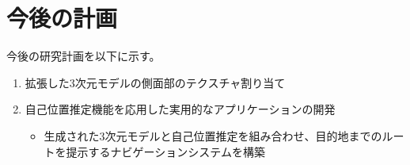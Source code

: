 \documentclass[]{jarticle}          %
\begin{document}
\section{今後の計画}
今後の研究計画を以下に示す。
\begin{enumerate}
  \item 拡張した3次元モデルの側面部のテクスチャ割り当て
  \item 自己位置推定機能を応用した実用的なアプリケーションの開発
  \begin{itemize}
    \item 生成された3次元モデルと自己位置推定を組み合わせ、目的地までのルートを提示するナビゲーションシステムを構築
  \end{itemize}
\end{enumerate}
\end{document}
